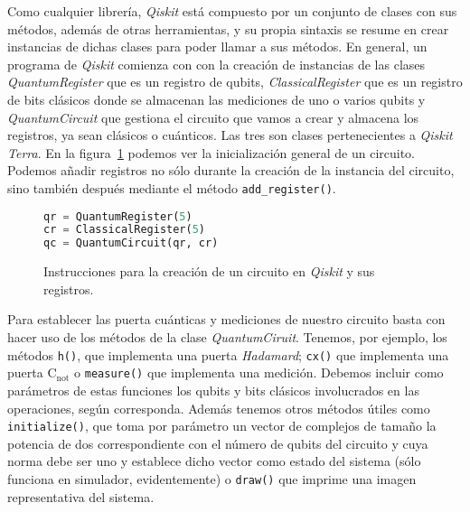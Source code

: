 Como cualquier librería, \textit{Qiskit} está compuesto por un conjunto de clases con sus métodos, además de otras herramientas, y su propia sintaxis se resume en crear instancias de dichas clases para poder llamar a sus métodos. En general, un programa de \textit{Qiskit} comienza con con la creación de instancias de las clases \textit{QuantumRegister} que es un registro de qubits, \textit{ClassicalRegister} que es un registro de bits clásicos donde se almacenan las mediciones de uno o varios qubits y \textit{QuantumCircuit} que gestiona el circuito que vamos a crear y almacena los registros, ya sean clásicos o cuánticos. Las tres son clases pertenecientes a \textit{Qiskit Terra}. En la figura~\ref{fig:code51} podemos ver la inicialización general de un circuito. Podemos añadir registros no sólo durante la creación de la instancia del circuito, sino también después mediante el método \texttt{add\_register()}.

\begin{figure}[b]
\begin{lstlisting}[language=Python]
qr = QuantumRegister(5)
cr = ClassicalRegister(5)
qc = QuantumCircuit(qr, cr)
\end{lstlisting}
\caption{Instrucciones para la creación de un circuito en \textit{Qiskit} y sus registros.}
\label{fig:code51}
\end{figure}

Para establecer las puerta cuánticas y mediciones de nuestro circuito basta con hacer uso de los métodos de la clase \textit{QuantumCiruit}. Tenemos, por ejemplo, los métodos \texttt{h()}, que implementa una puerta \textit{Hadamard}; \texttt{cx()} que implementa una puerta C$_\mathrm{not}$ o \texttt{measure()} que implementa una medición. Debemos incluir como parámetros de estas funciones los qubits y bits clásicos involucrados en las operaciones, según corresponda. Además tenemos otros métodos útiles como \texttt{initialize()}, que toma por parámetro un vector de complejos de tamaño la potencia de dos correspondiente con el número de qubits del circuito y cuya norma debe ser uno y establece dicho vector como estado del sistema (sólo funciona en simulador, evidentemente) o \texttt{draw()} que imprime una imagen representativa del sistema.

